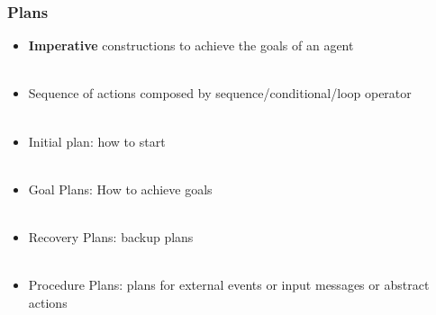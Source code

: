   
  \begin{frame}
    \frametitle{Plans}
    \begin{itemize}
      \item \textbf{Imperative} constructions to achieve the goals of an agent \\~\\
      \item Sequence of actions composed by sequence/conditional/loop operator \\~\\
      \item Initial plan: how to start\\~\\
      \item Goal Plans: How to achieve goals\\~\\
      \item Recovery Plans: backup plans\\~\\
      \item Procedure Plans: plans for external events or input messages or abstract actions\\~\\
    \end{itemize}
  \end{frame}
  
